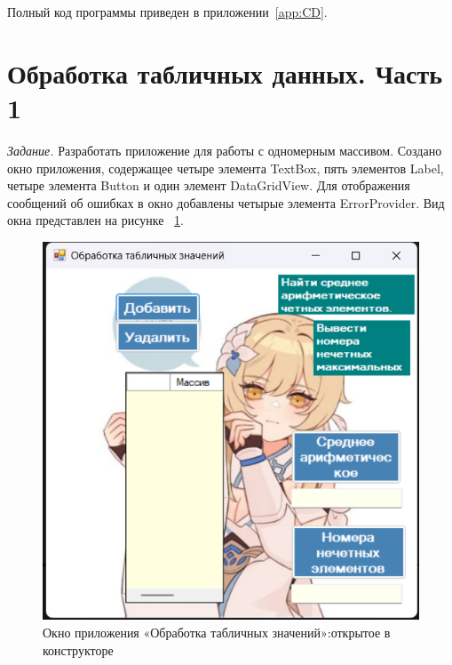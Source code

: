 \documentclass[bachelor, och, pract, times]{SCWorks}
\begin{document}
Полный код программы приведен в приложении~\ref{app:CD}.



\section{Обработка табличных данных. Часть 1}


\textsl{Задание.} Разработать приложение для работы с одномерным массивом.
Создано окно приложения, содержащее четыре элемента TextBox, пять
элементов Label, четыре элемента Button и один элемент DataGridView\cite{search_5}.
Для отображения сообщений об ошибках в окно добавлены четырые элемента
ErrorProvider. Вид окна представлен на рисунке ~\ref{fig:table1-01}.

\begin{figure}[H]
    \centering
    \includegraphics[scale=0.7]{Скрины/Снимок экрана 2025-01-03 222945.png}
    \caption{Окно приложения «Обработка табличных значений»:открытое в конструкторе}\label{fig:table1-01}
\end{figure}
\end{document}
